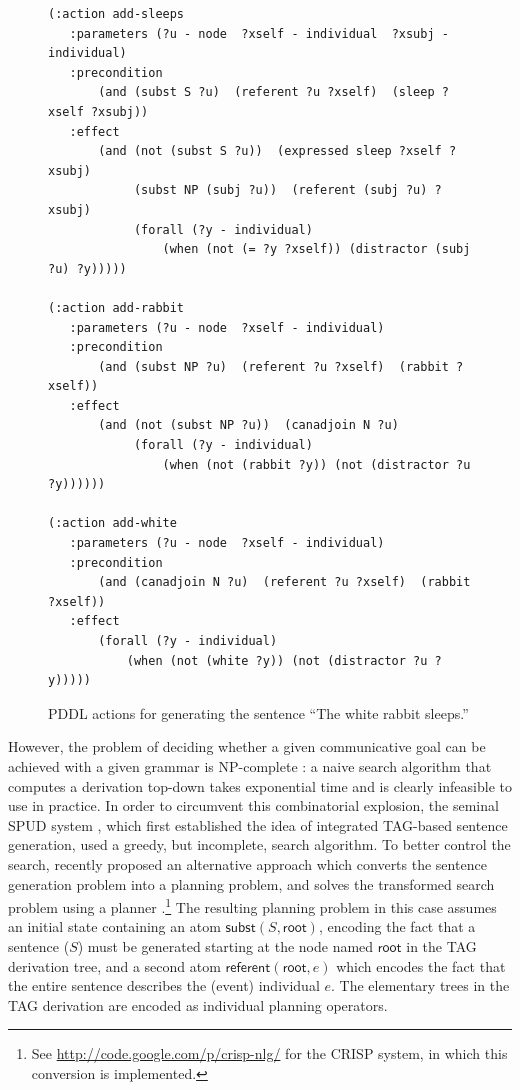 \begin{figure}
\centering
\begin{minipage}{0.8\textwidth}
{\small%
\begin{verbatim}
(:action add-sleeps
   :parameters (?u - node  ?xself - individual  ?xsubj - individual)
   :precondition
       (and (subst S ?u)  (referent ?u ?xself)  (sleep ?xself ?xsubj))
   :effect 
       (and (not (subst S ?u))  (expressed sleep ?xself ?xsubj)
            (subst NP (subj ?u))  (referent (subj ?u) ?xsubj)
            (forall (?y - individual)
                (when (not (= ?y ?xself)) (distractor (subj ?u) ?y)))))

(:action add-rabbit
   :parameters (?u - node  ?xself - individual)
   :precondition 
       (and (subst NP ?u)  (referent ?u ?xself)  (rabbit ?xself))
   :effect 
       (and (not (subst NP ?u))  (canadjoin N ?u)
            (forall (?y - individual)
                (when (not (rabbit ?y)) (not (distractor ?u ?y))))))

(:action add-white
   :parameters (?u - node  ?xself - individual)
   :precondition 
       (and (canadjoin N ?u)  (referent ?u ?xself)  (rabbit ?xself))
   :effect 
       (forall (?y - individual)
           (when (not (white ?y)) (not (distractor ?u ?y)))))
\end{verbatim}}%
\end{minipage}
\caption{PDDL actions for generating the sentence ``The white rabbit
sleeps.''}
\label{fig:white-rabbit-as-planning}
\end{figure}

However, the problem of deciding whether a given communicative goal can be
achieved with a given grammar is NP-complete \citep{KolStr02}: a naive
search algorithm that computes a derivation top-down takes exponential time
and is clearly infeasible to use in practice. In order to circumvent this
combinatorial explosion, the seminal SPUD system \citep{Stone2003a}, which
first established the idea of integrated TAG-based sentence generation,
used a greedy, but incomplete, search algorithm.
%
To better control the search, \citet{KolSto07} recently proposed an
alternative approach which converts the sentence generation problem into a
planning problem, and solves the transformed search problem using a planner
\citep{KolSto07}.\footnote{See
  \url{http://code.google.com/p/crisp-nlg/} for the CRISP system, in
  which this conversion is implemented.} The resulting planning problem in
this case assumes an initial state containing an atom
$\mathsf{subst}(S,\mathsf{root})$, encoding the fact that a sentence ($S$)
must be generated starting at the node named $\mathsf{root}$ in the TAG
derivation tree, and a second atom $\mathsf{referent}(\mathsf{root},e)$
which encodes the fact that the entire sentence describes the (event)
individual $e$. The elementary trees in the TAG derivation are encoded as
individual planning operators.

